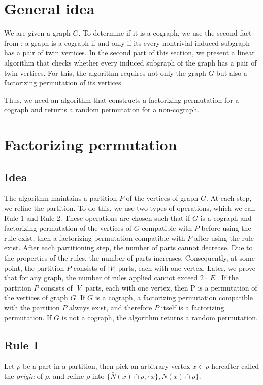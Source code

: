 \label{Algorithm}
\section{General idea}
We are given a graph $G$. To determine if it is a cograph, we use the second fact from : a graph is a cograph if and only if its every nontrivial induced subgraph has a pair of twin vertices. In the second part of this section, we present a linear algorithm that checks whether every induced subgraph of the graph has a pair of twin vertices. For this, the algorithm requires not only the graph $G$ but also a factorizing permutation of its vertices.

Thus, we need an algorithm that constructs a factorizing permutation for a cograph and returns a random permutation for a non-cograph.
\section{Factorizing permutation}

\subsection{Idea}
The algorithm maintains a partition $P$ of the vertices of graph $G$. At each step, we refine the partition. To do this, we use two types of operations, which we call Rule 1 and Rule 2. These operations are chosen such that if $G$ is a cograph and factorizing permutation of the vertices of $G$ compatible with $P$ before using the rule exist, then a factorizing permutation compatible with $P$ after using the rule exist. After each partitioning step, the number of parts cannot decrease. Due to the properties of the rules, the number of parts increases. Consequently, at some point, the partition $P$ consists of $|V|$ parts, each with one vertex.
Later, we prove that for any graph, the number of rules applied cannot exceed $2 \cdot |E|$. If the partition $P$ consists of $|V|$ parts, each with one vertex, then P is a permutation of the vertices of graph $G$. If $G$ is a cograph, a factorizing permutation compatible with the partition $P$ always exist, and therefore $P$ itself is a factorizing permutation. If $G$ is not a cograph, the algorithm returns a random permutation.
\subsection{Rule 1}

\begin{definition}
 Let $\rho$ be a part in a partition, then pick an arbitrary vertex $x \in \rho$  hereafter called the \emph{origin} of $\rho$, and refine $\rho$ into $\{  \bar{N}(x) \cap \rho, \{x\}, N(x) \cap \rho \}$.  
 \label{Rule 1}
\end{definition}



